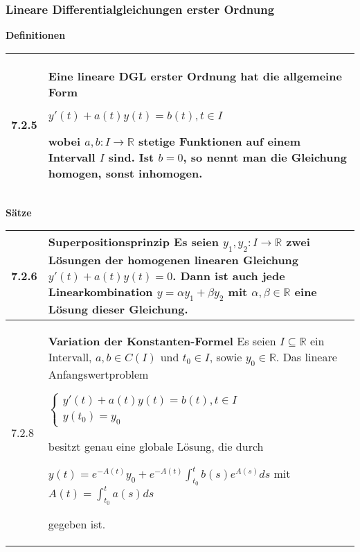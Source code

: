     


\subsubsection{Lineare Differentialgleichungen erster Ordnung}

    \noindent
    \textbf{Definitionen}
      
    \begin{longtable}{p{1cm} p{16cm}}
        \toprule

        7.2.5 & Eine lineare DGL erster Ordnung hat die allgemeine Form \hfill \break
                \centerline{$ y'(t) + a(t) y(t) = b(t), t \in I$}
                wobei $a,b: I \rightarrow \mathbb{R}$ stetige Funktionen auf einem Intervall $I$ sind. \hfill \break
                Ist $b= 0$, so nennt man die Gleichung homogen, sonst inhomogen. \\

        \bottomrule

    \end{longtable}
    

    \noindent 
    \textbf{Sätze}
    
    \begin{longtable}{p{1cm} p{16cm}}
        \toprule

        7.2.6 & \textbf{Superpositionsprinzip} \hfill \break
                Es seien $y_1, y_2: I \rightarrow \mathbb{R}$ zwei Lösungen der homogenen linearen Gleichung $y'(t) + a(t)y(t) = 0$.
                Dann ist auch jede Linearkombination $y = \alpha y_1 + \beta y_2$ mit $\alpha, \beta \in \mathbb{R}$ eine Lösung dieser
                Gleichung. \\
        \midrule
        7.2.8 & \textbf{Variation der Konstanten-Formel} \hfill \break
                Es seien $I \subseteq \mathbb{R}$ ein Intervall, $a,b \in C(I)$ und $t_0 \in I$, sowie $y_0 \in \mathbb{R}$. Das lineare
                Anfangswertproblem \hfill \break
                \centerline{$   \begin{cases}
                                y'(t) + a(t)y(t) = b(t), t \in I \\
                                y(t_0) = y_0
                                \end{cases} $}
                besitzt genau eine globale Lösung, die durch \hfill \break
                \centerline{$ y(t) = e^{-A(t)} y_0 + e^{-A(t)} \int^t_{t_0} b(s)e^{A(s)}ds$ mit $ A(t) = \int^t_{t_0} a(s) ds $}
                gegeben ist. \\

        \bottomrule
    \end{longtable}
    

